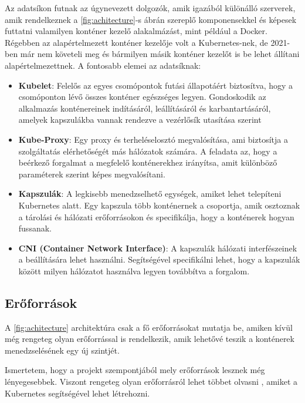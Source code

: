 Az adatsíkon futnak az úgynevezett dolgozók, amik igazából különálló szerverek,
amik rendelkeznek a \ref{fig:achitecture}-s ábrán szereplő komponensekkel és képesek 
futtatni valamilyen konténer kezelő alakalmázást, mint például a Docker. Régebben az 
alapértelmezett konténer kezelője volt a Kubernetes-nek, de 2021-ben már nem követeli meg 
és bármilyen másik konténer kezelőt is be lehet állítani alapértelmezettnek. A fontosabb 
elemei az adatsíknak:

\begin{itemize}
	\item \textbf{Kubelet}: Felelős az egyes csomópontok futási állapotáért biztosítva, 
	hogy a csomóponton lévő összes konténer egészséges legyen. Gondoskodik az alkalmazás
	konténereinek indításáról, leállításáról és karbantartásáról, amelyek kapszulákba 
	vannak rendezve a vezérlősík utasítása szerint
	\item \textbf{Kube-Proxy}: Egy proxy és terheléselosztó megvalósítása, ami biztosítja
	a szolgáltatás elérhetőségét más hálózatok számára. A feladata az, hogy a beérkező
	forgalmat a megfelelő konténerekhez irányítsa, amit különböző paraméterek szerint 
	képes megvalósítani.
	\item \textbf{Kapszulák}: A legkisebb menedzselhető egységek, amiket lehet telepíteni
	Kubernetes alatt. Egy kapszula több konténernek a csoportja, amik osztoznak a tárolási
	és hálózati erőforrásokon és specifikálja, hogy a konténerek hogyan fussanak. 
	\item \textbf{CNI (Container Network Interface)}: A kapszulák hálózati interfészeinek
	a beállítására lehet használni. Segítségével specifikálni lehet, hogy a kapszulák között milyen hálózatot használva legyen továbbítva a forgalom. 
\end{itemize}

\subsection{Erőforrások}

A \ref{fig:achitecture} architektúra csak a fő erőforrásokat mutatja be, amiken kívül
még rengeteg olyan erőforrással is rendelkezik, amik lehetővé teszik a konténerek 
menedzselésének egy új szintjét. 

Ismertetem, hogy a projekt szempontjából mely erőforrások lesznek még lényegesebbek. 
Viszont rengeteg olyan erőforrásról lehet többet olvasni \cite{kubeAPI}, amiket a 
Kubernetes segítségével lehet létrehozni.   

